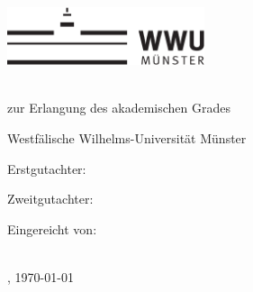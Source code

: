 \thispagestyle{empty}

\begin{center}
    \includegraphics[height=1.7cm]{logos/wwu.pdf}
    \hfill
    \par
    \vspace*{8ex}
    {
        \linespread{0.9}
        \LARGE
        \printtitle
        \par
    }
    \normalsize
    \vspace*{8ex}
    \large
    \textsc{\printtype}\\
    \normalsize
    zur Erlangung des akademischen Grades\\
    \large
    \textsc{\printdegree}
    \par
    \normalsize
    \vspace*{6ex}
    Westfälische Wilhelms-Universität Münster\\
    \printinstitute
\end{center}

\par
\vspace*{6ex}
Erstgutachter:\\
\large
\textit{\printfirstassessor}

\par
\normalsize
\vspace*{2ex}
Zweitgutachter:\\
\large
\textit{\printsecondassessor}

\par
\normalsize
\vspace*{2ex}
Eingereicht von: \\ %
\large
\textit{\printname} \\ %





\par
\normalsize
\vspace*{4ex}
\printcity, \today %

